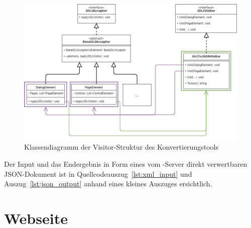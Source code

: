 \begin{figure}
    \centering
    \captionsetup{justification=centering}
    \includegraphics[width=\textwidth]{figures/web-converter_class-diagramm.png}
        \caption{Klassendiagramm der Visitor-Struktur des Konvertierungstools}\label{fig:web-conv_class-diagramm}
\end{figure}

Der Input und das Endergebnis in Form eines vom -Server direkt verwertbaren JSON-Dokument ist in Quellcodeauszug~\ref{lst:xml_input} und Auszug~\ref{lst:json_output} anhand eines kleines Auszuges ersichtlich.





\section{Webseite}

